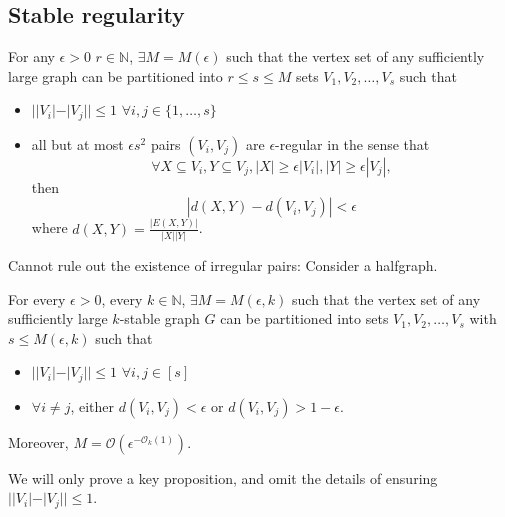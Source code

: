 \documentclass{article}
\begin{document}
\subsection{Stable regularity}
\begin{thm}
  For any $\epsilon > 0$ $r \in \mathbb{N}$, $\exists M = M(\epsilon)$ such that the vertex set of any sufficiently large graph can be partitioned into $r \leq s \leq M$ sets $V_1, V_2, \dotsc, V_s$ such that
  \begin{itemize}
    \item $||V_i| - |V_j|| \leq 1$ $\forall i,j \in \{1, \dotsc, s\}$
    \item all but at most $\epsilon s^2$ pairs $(V_i, V_j)$ are $\epsilon$-regular in the sense that
      \begin{equation*}
        \forall X \subseteq V_i, Y \subseteq V_j, |X| \geq \epsilon |V_i|, |Y| \geq \epsilon |V_j|,
      \end{equation*}
      then
      \begin{equation*}
        |d(X,Y) - d(V_i,V_j)| < \epsilon
      \end{equation*}
      where $d(X,Y) = \frac{|E(X,Y)|}{|X| |Y|}$.
  \end{itemize}
\end{thm}
Cannot rule out the existence of irregular pairs: Consider a halfgraph.
\begin{thm}
  For every $\epsilon > 0$, every $k \in \mathbb{N}$, $\exists M = M(\epsilon,k)$ such that the vertex set of any sufficiently large $k$-stable graph $G$ can be partitioned into sets $V_1, V_2, \dotsc, V_s$ with $s \leq M(\epsilon,k)$ such that
  \begin{itemize}
    \item $||V_i| - |V_j|| \leq 1$ $\forall i, j \in [s]$
    \item $\forall i \neq j$, either $d(V_i, V_j) < \epsilon$ or $d(V_i, V_j) > 1-\epsilon$.
  \end{itemize}

  Moreover, $M = \mathcal{O}(\epsilon^{-\mathcal{O}_k(1)})$.
\end{thm}
We will only prove a key proposition, and omit the details of ensuring $||V_i| - |V_j|| \leq 1$.
\end{document}
